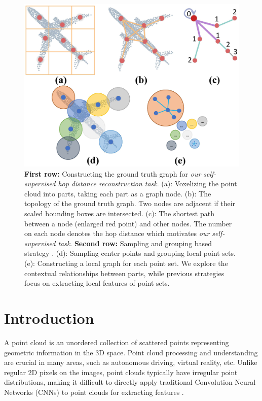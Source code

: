 \documentclass[letterpaper]{article} %
\begin{document}
\begin{figure}[!h]
\centering
\begin{minipage}[b]{0.9\linewidth}
\begin{center}
\includegraphics[width=0.85\linewidth]{images/intro_pic.jpg}
\end{center}
\end{minipage}
\caption{
\textbf{First row:} Constructing the ground truth graph for \textit{our self-supervised hop distance reconstruction task}. (a): Voxelizing the point cloud into parts, taking each part as a graph node. (b): The topology of the ground truth graph. Two nodes are adjacent if their scaled bounding boxes are intersected. (c): The shortest path between a node (enlarged red point) and other nodes.
The number on each node denotes the hop distance which motivates \textit{our self-supervised task}.
\textbf{Second row:} Sampling and grouping based strategy \cite{dgcnn, wang2019graphattenconv}. (d): Sampling center points and grouping local point sets. (e): Constructing a local graph for each point set.
We explore the contextual relationships between parts, while previous strategies focus on extracting local features of point sets.
}
\label{fig:intro_pic}
\end{figure}


\section{Introduction}
\label{sec:intro}
A point cloud is an unordered collection of scattered points representing geometric information in the 3D space.
Point cloud processing and understanding are crucial in many areas, such as autonomous driving, virtual reality, etc.
Unlike regular 2D pixels on the images, point clouds typically have irregular point distributions, making it difficult to directly apply traditional Convolution Neural Networks (CNNs) to point clouds for extracting features \cite{shi2020pointgnn,de2023iterativepfn,zhang2020pointfilter}.
\end{document}
